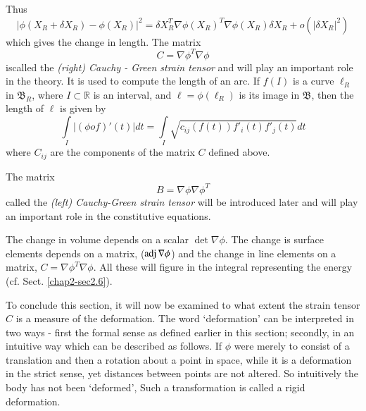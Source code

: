 Thus
\begin{equation*}
| \phi (X_R + \delta X_R ) - \phi (X_R) |^2 = \delta X^T_R
\nabla  \phi (X_R)^T \nabla  \phi (X_R) \delta X_R +
o(|\delta X_R|^2) \tag{1.1-11} \label{eq1.1-11}
\end{equation*}
which gives the change in length. The matrix 
\begin{equation*}
C = \nabla  \phi^T \nabla  \phi \tag{1.1-12}\label{eq1.1-12}
\end{equation*}
is\pageoriginale  called the  \textit{(right) Cauchy - Green strain
  tensor} and will 
play an important role in the theory. It is used to compute the length
of an arc. If $f(I)$ is a curve $\ell_R$ in $\mathfrak{B}_R$, where $I
\subset \mathbb{R}$ is an interval, and $\ell = \phi (\ell_R)$ is its
image in $\mathfrak{B}$, then the length of $\ell$ is given by 
$$
\int \limits_I | (\phi of)' (t) | dt = \int \limits_I \sqrt{c_{ij}
 (f(t)) f'_i(t) f'_j (t)} dt 
$$
where $C_{ij}$ are the components of the matrix $C$ defined above.

\begin{remark}\label{chap1-rem1.1.3} %
The matrix
\begin{equation*}
 B = \nabla  \phi \nabla \phi^T \tag{1.1-13}\label{eq1.1-13}
\end{equation*}
called the \textit{(left) Cauchy-Green strain
  tensor} will be 
introduced later and will play an important role in the constitutive
equations. 
\end{remark}

\begin{remark}\label{chap1-rem1.1.4} %
The change in volume depends on a scalar $\det \nabla
\phi$. The change is surface elements depends on a matrix, ($\operatorname{adj}
\nabla \phi$) and the change in line elements on a matrix, $C
= \nabla  \phi^T \nabla  \phi$. All these will figure
in the integral representing the energy (cf. Sect. \ref{chap2-sec2.6}). 
\end{remark}

To conclude this section, it will now be examined to what extent the
strain tensor $C$ is a measure of the deformation. The word
`deformation' can be interpreted in two ways - first the formal sense
as defined earlier in this section; secondly, in an intuitive way
which can be described as follows. If $\phi$ were merely to consist of
a translation and then a rotation about a point in space, while it is
a deformation in the strict sense, yet distances between points are
not altered. So intuitively the body has not been `deformed', Such a
transformation is called a rigid deformation. 

